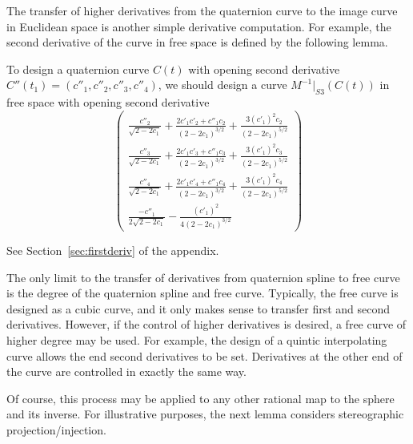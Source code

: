 \documentclass[12pt]{article}
\begin{document}
The transfer of higher derivatives from the quaternion curve to the 
image curve in Euclidean space is another simple derivative computation.
For example, the second derivative of the curve in free space is defined by the
following lemma.

\begin{lemma}
\label{lem:secderiv}
To design a quaternion curve $C(t)$ with opening second derivative 
$C''(t_1) = (c''_1,c''_2,c''_3,c''_4)$, we should design a curve 
$M^{-1}|_{S3}(C(t))$ in free space with opening second derivative
\[
\left(
\begin{array}{c}
\frac{c''_2}{\sqrt{2-2c_1}} + \frac{2c'_1 c'_2 + c''_1 c_2}{(2-2c_1)^{3/2}}
+ \frac{3(c'_1)^2 c_2}{(2-2c_1)^{5/2}}\\

\frac{c''_3}{\sqrt{2-2c_1}} + \frac{2c'_1 c'_3 + c''_1 c_3}{(2-2c_1)^{3/2}}
+ \frac{3(c'_1)^2 c_3}{(2-2c_1)^{5/2}}\\

\frac{c''_4}{\sqrt{2-2c_1}} + \frac{2c'_1 c'_4 + c''_1 c_4}{(2-2c_1)^{3/2}}
+ \frac{3(c'_1)^2 c_4}{(2-2c_1)^{5/2}}\\

\frac{-c''_1}{2\sqrt{2-2c_1}} - \frac{(c'_1)^2}{4(2-2c_1)^{3/2}}
\end{array}
\right)
\]
\end{lemma}
\prf
See Section~\ref{sec:firstderiv} of the appendix.
\QED

The only limit to the transfer of derivatives from quaternion spline to free curve is
the degree of the quaternion spline and free curve.
Typically, the free curve is designed as a cubic curve,
and it only makes sense to transfer first and second derivatives.
However, if the control of higher derivatives is desired, 
a free curve of higher degree may be used.
For example, the design of a quintic interpolating curve allows the end 
second derivatives to be set.
Derivatives at the other end of the curve are controlled in exactly the same way.

Of course, this process may be applied to any other rational map to the sphere and its
inverse.
For illustrative purposes, the next lemma considers stereographic projection/injection. 
\end{document}
